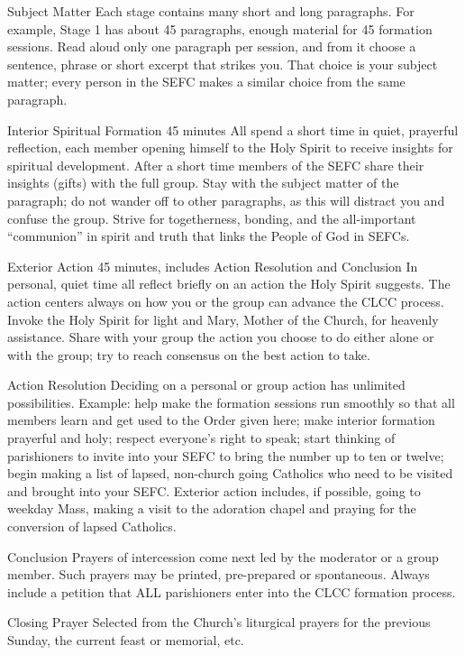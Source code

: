 \documentclass[oneside]{book}
\begin{document}
Subject Matter
Each stage contains many short and long paragraphs. For example, Stage 1 has
about 45 paragraphs, enough material for 45 formation sessions. Read aloud only
one paragraph per session, and from it choose a sentence, phrase or short
excerpt that strikes you. That choice is your subject matter; every person in
the SEFC makes a similar choice from the same paragraph.

Interior Spiritual Formation
45 minutes
All spend a short time in quiet, prayerful reflection, each member opening
himself to the Holy Spirit to receive insights for spiritual development. After
a short time members of the SEFC share their insights (gifts) with the full
group. Stay with the subject matter of the paragraph; do not wander off to other
paragraphs, as this will distract you and confuse the group. Strive for
togetherness, bonding, and the all-important ``communion'' in spirit and truth
that links the People of God in SEFCs.

Exterior Action
45 minutes, includes Action Resolution and Conclusion
In personal, quiet time all reflect briefly on an action the Holy Spirit
suggests. The action centers always on how you or the group can advance the CLCC
process. Invoke the Holy Spirit for light and Mary, Mother of the Church, for
heavenly assistance. Share with your group the action you choose to do either
alone or with the group; try to reach consensus on the best action to take.

Action Resolution
Deciding on a personal or group action has unlimited possibilities. Example:
help make the formation sessions run smoothly so that all members learn and get
used to the Order given here; make interior formation prayerful and holy;
respect everyone's right to speak; start thinking of parishioners to invite into
your SEFC to bring the number up to ten or twelve; begin making a list of
lapsed, non-church going Catholics who need to be visited and brought into your
SEFC. Exterior action includes, if possible, going to weekday Mass, making a
visit to the adoration chapel and praying for the conversion of lapsed
Catholics.

Conclusion
Prayers of intercession come next led by the moderator or a group member. Such
prayers may be printed, pre-prepared or spontaneous. Always include a petition
that ALL parishioners enter into the CLCC formation process.

Closing Prayer
Selected from the Church's liturgical prayers for the previous Sunday, the
current feast or memorial, etc.
\end{document}
